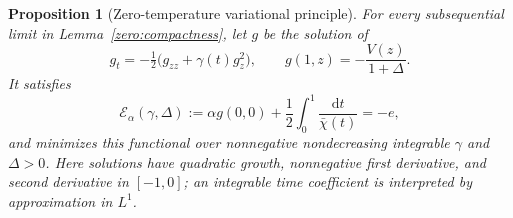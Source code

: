 \documentclass[11pt,a4paper]{article}
\numberwithin{equation}{section}
\newtheorem{proposition}[theorem]{Proposition}
\theoremstyle{definition}
\theoremstyle{remark}
\newcommand{\dd}{\mathrm d}
\begin{document}
\begin{proposition}[Zero-temperature variational principle]
\label{zero:variational}
For every subsequential limit in Lemma~\ref{zero:compactness}, let \(g\)
be the solution of
\[
 g_t=-\tfrac12\bigl(g_{zz}+\gamma(t)g_z^2\bigr),
 \qquad g(1,z)=-\frac{V(z)}{1+\Delta}.
\]
It satisfies
\begin{equation}
 \mathcal E_\alpha(\gamma,\Delta)
 :=\alpha g(0,0)+\frac12\int_0^1\frac{\dd t}{\bar\chi(t)}
 =-e,
 \label{eq:src15}
\end{equation}
and minimizes this functional over nonnegative nondecreasing
integrable \(\gamma\) and \(\Delta>0\).
Here solutions have quadratic growth, nonnegative first derivative,
and second derivative in \([-1,0]\); an integrable time coefficient
is interpreted by approximation in \(L^1\).
\end{proposition}
\end{document}
